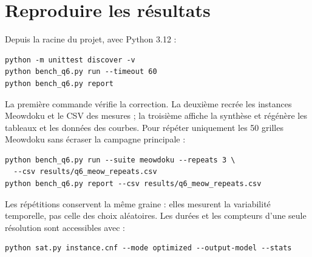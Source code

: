 \documentclass[10pt,a4paper]{article}
\begin{document}
\section{Reproduire les résultats}

Depuis la racine du projet, avec Python 3.12 :
\begin{lstlisting}
python -m unittest discover -v
python bench_q6.py run --timeout 60
python bench_q6.py report
\end{lstlisting}
La première commande vérifie la correction. La deuxième recrée les
instances Meowdoku et le CSV des mesures ; la troisième affiche la
synthèse et régénère les tableaux et les données des courbes. Pour
répéter uniquement les 50 grilles Meowdoku sans écraser la campagne
principale :
\begin{lstlisting}
python bench_q6.py run --suite meowdoku --repeats 3 \
  --csv results/q6_meow_repeats.csv
python bench_q6.py report --csv results/q6_meow_repeats.csv
\end{lstlisting}
Les répétitions conservent la même graine : elles mesurent la variabilité
temporelle, pas celle des choix aléatoires. Les durées et les compteurs
d'une seule résolution sont accessibles avec :
\begin{lstlisting}
python sat.py instance.cnf --mode optimized --output-model --stats
\end{lstlisting}
\end{document}
